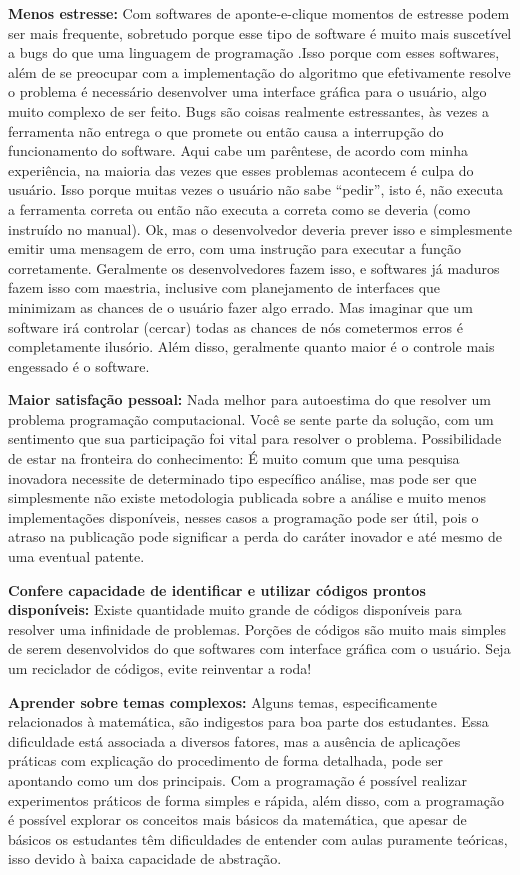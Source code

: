 \documentclass[
  11pt,
  a5paper,
  openany]{book}
\begin{document}
\textbf{Menos estresse:} Com softwares de aponte-e-clique momentos de estresse podem ser mais frequente, sobretudo porque esse tipo de software é muito mais suscetível a bugs do que uma linguagem de programação .Isso porque com esses softwares, além de se preocupar com a implementação do algoritmo que efetivamente resolve o problema é necessário desenvolver uma interface gráfica para o usuário, algo muito complexo de ser feito. Bugs são coisas realmente estressantes, às vezes a ferramenta não entrega o que promete ou então causa a interrupção do funcionamento do software. Aqui cabe um parêntese, de acordo com minha experiência, na maioria das vezes que esses problemas acontecem é culpa do usuário. Isso porque muitas vezes o usuário não sabe ``pedir'', isto é, não executa a ferramenta correta ou então não executa a correta como se deveria (como instruído no manual). Ok, mas o desenvolvedor deveria prever isso e simplesmente emitir uma mensagem de erro, com uma instrução para executar a função corretamente. Geralmente os desenvolvedores fazem isso, e softwares já maduros fazem isso com maestria, inclusive com planejamento de interfaces que minimizam as chances de o usuário fazer algo errado. Mas imaginar que um software irá controlar (cercar) todas as chances de nós cometermos erros é completamente ilusório. Além disso, geralmente quanto maior é o controle mais engessado é o software.

\textbf{Maior satisfação pessoal:} Nada melhor para autoestima do que resolver um problema programação computacional. Você se sente parte da solução, com um sentimento que sua participação foi vital para resolver o problema.
Possibilidade de estar na fronteira do conhecimento: É muito comum que uma pesquisa inovadora necessite de determinado tipo específico análise, mas pode ser que simplesmente não existe metodologia publicada sobre a análise e muito menos implementações disponíveis, nesses casos a programação pode ser útil, pois o atraso na publicação pode significar a perda do caráter inovador e até mesmo de uma eventual patente.

\textbf{Confere capacidade de identificar e utilizar códigos prontos disponíveis:} Existe quantidade muito grande de códigos disponíveis para resolver uma infinidade de problemas. Porções de códigos são muito mais simples de serem desenvolvidos do que softwares com interface gráfica com o usuário. Seja um reciclador de códigos, evite reinventar a roda!

\textbf{Aprender sobre temas complexos:} Alguns temas, especificamente relacionados à matemática, são indigestos para boa parte dos estudantes. Essa dificuldade está associada a diversos fatores, mas a ausência de aplicações práticas com explicação do procedimento de forma detalhada, pode ser apontando como um dos principais. Com a programação é possível realizar experimentos práticos de forma simples e rápida, além disso, com a programação é possível explorar os conceitos mais básicos da matemática, que apesar de básicos os estudantes têm dificuldades de entender com aulas puramente teóricas, isso devido à baixa capacidade de abstração.
\end{document}
